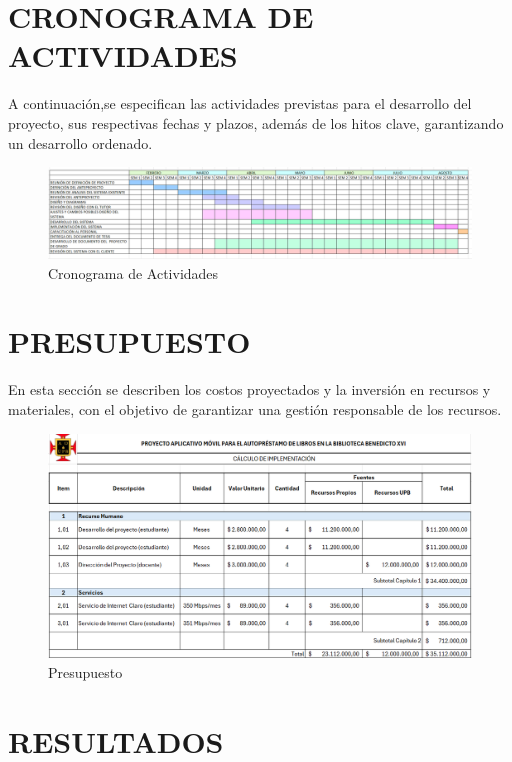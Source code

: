 \documentclass[spanish]{ieee_upb}
\begin{document}
\newpage
\section{CRONOGRAMA DE ACTIVIDADES}
A continuación,se especifican las actividades previstas para el desarrollo del proyecto, sus respectivas fechas y plazos, además de los hitos clave, garantizando un desarrollo ordenado.

\begin{figure}[htpb]
    \centering
    \includegraphics[width=1\linewidth]{img/cronograma.png}
    \caption[Cronograma de Actividades]{Cronograma de Actividades}
    \label{fig:cronograma}
\end{figure}

\newpage
\section{PRESUPUESTO}
En esta sección se describen los costos proyectados y la inversión en recursos y materiales, con el objetivo de garantizar una gestión responsable de los recursos.

\begin{figure}[htpb]
    \centering
    \includegraphics[width=1\linewidth]{img/p.png}
    \caption[Presupuesto]{Presupuesto}
    \label{fig:presupuesto}
\end{figure}


\newpage
\section{RESULTADOS}
\end{document}

